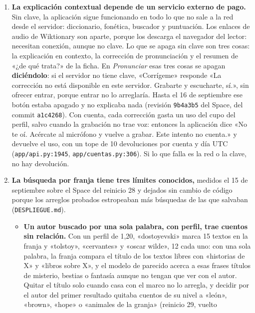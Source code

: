 \documentclass[11pt,a4paper]{article}
\newcommand{\cod}[1]{\texttt{\small #1}}
\begin{document}
\begin{enumerate}[leftmargin=*, itemsep=4pt]
  \item \textbf{La explicación contextual depende de un servicio externo de pago.} Sin
        clave, la aplicación sigue funcionando en todo lo que no sale a la red desde el
        servidor: diccionario, fonética, buscador y puntuación. Los enlaces de audio de
        Wiktionary son aparte, porque los descarga el navegador del lector: necesitan
        conexión, aunque no clave. Lo que se apaga sin clave son tres cosas: la
        explicación en contexto, la corrección de pronunciación y el resumen de
        «¿de qué trata?» de la ficha. En \emph{Pronunciar} esas tres cosas se apagan
        \textbf{diciéndolo}: si el servidor no tiene clave, «Corrígeme» responde «La
        corrección no está disponible en este servidor. Grabarte y escucharte, sí.», sin
        ofrecer entrar, porque entrar no lo arreglaría. Hasta el 16 de septiembre ese botón
        estaba apagado y no explicaba nada (revisión \cod{9b4a3b5} del Space, del commit
        \cod{a1c4268}). Con cuenta, cada corrección gasta un uso del cupo del
        perfil, salvo cuando la grabación no trae voz: entonces la aplicación dice «No te
        oí. Acércate al micrófono y vuelve a grabar. Este intento no cuenta.» y devuelve el
        uso, con un tope de 10 devoluciones por cuenta y día UTC (\cod{app/api.py:1945},
        \cod{app/cuentas.py:306}). Si lo que falla es la red o la clave, no hay devolución.
  \item \textbf{La búsqueda por franja tiene tres límites conocidos,} medidos el 15 de
        septiembre sobre el Space del reinicio 28 y dejados sin cambio de código porque
        los arreglos probados estropeaban más búsquedas de las que salvaban
        (\cod{DESPLIEGUE.md}).
        \begin{itemize}
          \item \textbf{Un autor buscado por una sola palabra, con perfil, trae cuentos
                sin relación.} Con un perfil de 1,20, «dostoyevski» marca 15 textos en la
                franja y «tolstoy», «cervantes» y «oscar wilde», 12 cada uno: con una sola
                palabra, la franja compara el título de los textos libres con «historias
                de X» y «libros sobre X», y el modelo de parecido acerca a esas frases
                títulos de misterio, bestias o fantasía aunque no tengan que ver con el
                autor. Quitar el título solo cuando casa con el marco no lo arregla, y
                decidir por el autor del primer resultado quitaba cuentos de su nivel a
                «león», «brown», «hope» o «animales de la granja» (reinicio 29, vuelto

\end{itemize}
\end{enumerate}
\end{document}
